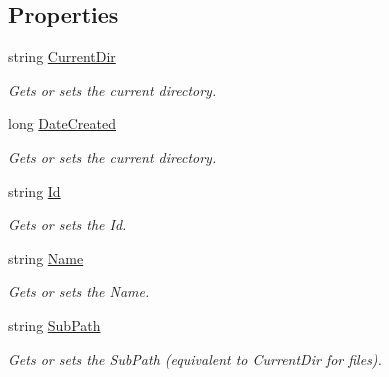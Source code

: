 \subsection*{Properties}
\begin{DoxyCompactItemize}
\item 
string \hyperlink{class_microsoft_1_1_tools_1_1_windows_device_portal_1_1_device_portal_1_1_file_or_folder_information_a8747e01e3e4ed046356e804ccf68c14f}{Current\+Dir}
\begin{DoxyCompactList}\small\item\em Gets or sets the current directory. \end{DoxyCompactList}\item 
long \hyperlink{class_microsoft_1_1_tools_1_1_windows_device_portal_1_1_device_portal_1_1_file_or_folder_information_a6b53f93c5a67f14b3686a37f4bc2c873}{Date\+Created}
\begin{DoxyCompactList}\small\item\em Gets or sets the current directory. \end{DoxyCompactList}\item 
string \hyperlink{class_microsoft_1_1_tools_1_1_windows_device_portal_1_1_device_portal_1_1_file_or_folder_information_a482d1688d5c079deb423c70dd288dc2a}{Id}
\begin{DoxyCompactList}\small\item\em Gets or sets the Id. \end{DoxyCompactList}\item 
string \hyperlink{class_microsoft_1_1_tools_1_1_windows_device_portal_1_1_device_portal_1_1_file_or_folder_information_a13e4fc7478e92193916086d0afc8b9e8}{Name}
\begin{DoxyCompactList}\small\item\em Gets or sets the Name. \end{DoxyCompactList}\item 
string \hyperlink{class_microsoft_1_1_tools_1_1_windows_device_portal_1_1_device_portal_1_1_file_or_folder_information_a6815f559a460231a351acec1906e608e}{Sub\+Path}
\begin{DoxyCompactList}\small\item\em Gets or sets the Sub\+Path (equivalent to Current\+Dir for files). \end{DoxyCompactList}\item 

\end{DoxyCompactItemize}
